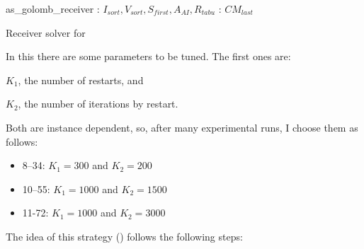 \begin{algorithm}
\dontprintsemicolon
\SetNoline
{}
   as\_golomb\_receiver\;
\algoindent {} : $I_{sort}, V_{sort}, S_{first}, A_{AI}, R_{tabu}$ \;
\algoindent {}: $CM_{last}$\;
\caption{Receiver solver for \GRP}\label{as:golomb_receiver}
\end{algorithm}

In this \commstr{} there are some parameters to be tuned. The first ones are: \begin{inparaenum}[1.] \item $K_1$, the number of restarts, and \item $K_2$, the number of iterations by restart. \end{inparaenum} Both are instance dependent, so, after many experimental runs, I choose them as follows:
\begin{itemize}
\item \gr{} 8--34: $K_1 = 300$ and $K_2 = 200$
\item \gr{} 10--55: $K_1 = 1000$ and $K_2 = 1500$
\item \gr{} 11-72: $K_1 = 1000$ and $K_2 = 3000$
\end{itemize}

The idea of this strategy (\as) follows the following steps:

